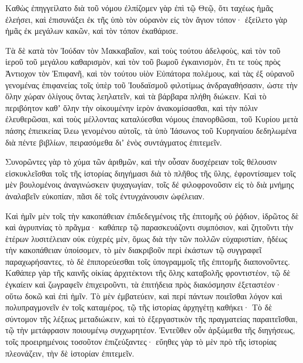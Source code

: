 {Καθὼς ἐπηγγείλατο διὰ τοῦ νόμου ἐλπίζομεν γὰρ ἐπὶ τῷ Θεῷ, ὅτι ταχέως ἡμᾶς ἐλεήσει, καὶ ἐπισυνάξει ἐκ τῆς ὑπὸ τὸν οὐρανὸν εἰς τὸν ἅγιον τόπον· ἐξείλετο γὰρ ἡμᾶς ἐκ μεγάλων κακῶν, καὶ τὸν τόπον ἐκαθάρισε.
\par }{\PP {}Τὰ δὲ κατὰ τὸν Ἰούδαν τὸν Μακκαβαῖον, καὶ τοὺς τούτου ἀδελφοὺς, καὶ τὸν τοῦ ἱεροῦ τοῦ μεγάλου καθαρισμὸν, καὶ τὸν τοῦ βωμοῦ ἐγκαινισμὸν,
ἔτι τε τοὺς πρὸς Ἀντιοχον τὸν Ἐπιφανῆ, καὶ τὸν τούτου υἱὸν Εὐπάτορα πολέμους,
καὶ τὰς ἐξ οὐρανοῦ γενομένας ἐπιφανείας τοῖς ὑπὲρ τοῦ Ἰουδαϊσμοῦ φιλοτίμως ἀνδραγαθήσασιν, ὡστε τὴν ὅλην χώραν ὀλίγους ὄντας λεηλατεῖν, καὶ τὰ βάρβαρα πλήθη διώκειν.
Καὶ τὸ περιβόητον καθʼ ὅλην τὴν οἰκουμένην ἱερὸν ἀνακομίσασθαι, καὶ τὴν πόλιν ἐλευθερῶσαι, καὶ τοὺς μέλλοντας καταλύεσθαι νόμους ἐπανορθῶσαι, τοῦ Κυρίου μετὰ πάσης ἐπιεικείας ἵλεω γενομένου αὐτοῖς,
τὰ ὑπὸ Ἰάσωνος τοῦ Κυρηναίου δεδηλωμένα διὰ πέντε βιβλίων, πειρασόμεθα διʼ ἑνὸς συντάγματος ἐπιτεμεῖν.
\par }{\PP {}Συνορῶντες γὰρ τὸ χύμα τῶν ἀριθμῶν, καὶ τὴν οὖσαν δυσχέρειαν τοῖς θέλουσιν εἰσκυκλεῖσθαι τοῖς τῆς ἱστορίας διηγήμασι διὰ τὸ πλῆθος τῆς ὕλης,
ἐφροντίσαμεν τοῖς μὲν βουλομένοις ἀναγινώσκειν ψυχαγωγίαν, τοῖς δέ φιλοφρονοῦσιν εἰς τὸ διὰ μνήμης ἀναλαβεῖν εὐκοπίαν, πᾶσι δὲ τοῖς ἐντυγχάνουσιν ὠφέλειαν.
\par }{\PP {}Καὶ ἡμῖν μὲν τοῖς τὴν κακοπάθειαν ἐπιδεδεγμένοις τῆς ἐπιτομῆς οὐ ῥᾴδιον, ἱδρῶτος δὲ καὶ ἀγρυπνίας τὸ πρᾶγμα·
καθάπερ τῷ παρασκευάζοντι συμπόσιον, καὶ ζητοῦντι τὴν ἑτέρων λυσιτέλειαν οὐκ εὐχερές μὲν, ὅμως διὰ τὴν τῶν πολλῶν εὐχαριστίαν, ἡδέως τὴν κακοπάθειαν ὑποίσομεν,
τὸ μὲν διακριβοῦν περὶ ἑκάστων τῷ συγγραφεῖ παραχωρήσαντες, τὸ δὲ ἐπιπορεύεσθαι τοῖς ὑπογραμμοῖς τῆς ἐπιτομῆς διαπονοῦντες.
Καθάπερ γὰρ τῆς καινῆς οἰκίας ἀρχιτέκτονι τῆς ὅλης καταβολῆς φροντιστέον, τῷ δὲ ἐγκαίειν καὶ ζωγραφεῖν ἐπιχειροῦντι, τὰ ἐπιτήδεια πρὸς διακόσμησιν ἐξεταστέον· οὕτω δοκῶ καὶ ἐπὶ ἡμῖν.
Τὸ μὲν ἐμβατεύειν, καὶ περί πάντων ποιεῖσθαι λόγον καὶ πολυπραγμονεῖν ἐν τοῖς καταμέρος, τῷ τῆς ἱστορίας ἀρχηγέτῃ καθήκει·
Τὸ δὲ σύντομον τῆς λέξεως μεταδιώκειν, καὶ τὸ ἐξεργαστικὸν τῆς πραγματείας παραιτεῖσθαι, τῷ τὴν μετάφρασιν ποιουμένῳ συγχωρητέον.
Ἐντεῦθεν οὖν ἀρξώμεθα τῆς διηγήσεως, τοῖς προειρημένοις τοσοῦτον ἐπιζεύξαντες· εὔηθες γὰρ τὸ μὲν πρὸ τῆς ἱστορίας πλεονάζειν, τὴν δὲ ἱστορίαν ἐπιτεμεῖν.

}
